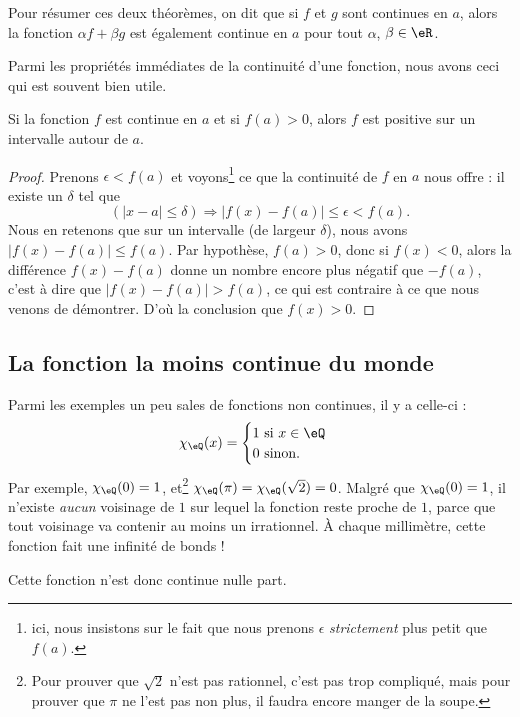 Pour résumer ces deux théorèmes, on dit que si $f$ et $g$ sont continues en $a$, alors la fonction $\alpha f+\beta g$ est également continue en $a$ pour tout $\alpha$, $\beta\in\eR$.

Parmi les propriétés immédiates de la continuité d'une fonction, nous avons ceci qui est souvent bien utile.

\begin{corollary}   \label{CorNNPYooMbaYZg}
Si la fonction $f$ est continue en $a$ et si $f(a)>0$, alors $f$ est positive sur un intervalle autour de $a$.
\end{corollary}

\begin{proof}
Prenons $\epsilon<f(a)$ et voyons\footnote{ici, nous insistons sur le fait que nous prenons $\epsilon$ \emph{strictement} plus petit que $f(a)$.} ce que la continuité de $f$ en $a$ nous offre : il existe un $\delta$ tel que
\[
  (| x-a |\leq \delta)\Rightarrow | f(x)-f(a) |\leq\epsilon < f(a).
\]
Nous en retenons que sur un intervalle (de largeur $\delta$), nous avons $| f(x)-f(a) |\leq f(a)$. Par hypothèse, $f(a)>0$, donc si $f(x)<0$, alors la différence $f(x)-f(a)$ donne un nombre encore plus négatif que $-f(a)$, c'est à dire que $| f(x)-f(a) |>f(a)$, ce qui est contraire à ce que nous venons de démontrer. D'où la conclusion que $f(x)>0$.
\end{proof}

\subsection{La fonction la moins continue du monde}

Parmi les exemples un peu sales de fonctions non continues, il y a celle-ci :
\[
  \chi_{\eQ}(x)=
\begin{cases}
    1 \text{ si }x\in\eQ\\
    0 \text{ sinon.}
\end{cases}
\]
Par exemple, $\chi_{\eQ}(0)=1$, et\footnote{Pour prouver que $\sqrt{2}$ n'est pas rationnel, c'est pas trop compliqué, mais pour prouver que $\pi$ ne l'est pas non plus, il faudra encore manger de la soupe.} $\chi_{\eQ}(\pi)=\chi_{\eQ}(\sqrt{2})=0$. Malgré que $\chi_{\eQ}(0)=1$, il n'existe \emph{aucun} voisinage de $1$ sur lequel la fonction reste proche de $1$, parce que tout voisinage va contenir au moins un irrationnel. À chaque millimètre, cette fonction fait une infinité de bonds !

Cette fonction n'est donc continue nulle part.

